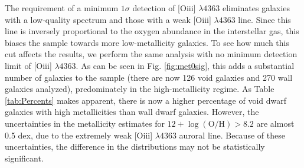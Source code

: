 

The requirement of a minimum $1\sigma$ detection of [O{\sc iii}] $\lambda 4363$ 
eliminates galaxies with a low-quality spectrum and those with a weak 
[O{\sc iii}] $\lambda 4363$ line.  Since this line is inversely proportional to 
the oxygen abundance in the interstellar gas, this biases the sample towards 
more low-metallicity galaxies.  To see how much this cut affects the results, we 
perform the same analysis with no minimum detection limit of [O{\sc iii}] 
$\lambda 4363$.  As can be seen in Fig. \ref{fig:met0sig}, this adds a 
substantial number of galaxies to the sample (there are now 126 void galaxies 
and 270 wall galaxies analyzed), predominately in the high-metallicity regime.  
As Table \ref{tab:Percents} makes apparent, there is now a higher percentage of 
void dwarf galaxies with high metallicities than wall dwarf galaxies.  However, 
the uncertainties in the metallicity estimates for 
$12 + \log (\text{O}/\text{H}) > 8.2$ are almost 0.5 dex, due to the extremely 
weak [O{\sc iii}] $\lambda 4363$ auroral line.  Because of these uncertainties, 
the difference in the distributions may not be statistically significant.


